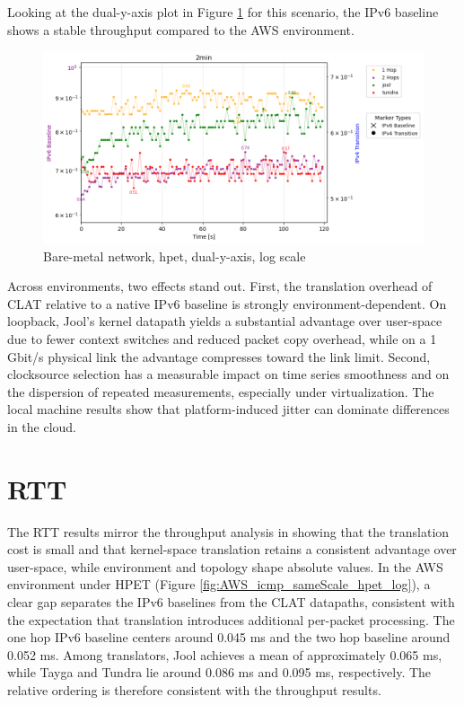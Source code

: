 Looking at the dual-y-axis plot in Figure \ref{fig:Double_tcp_dualAxis_hpet_log} for this scenario, the IPv6 baseline shows a stable throughput compared to the AWS environment.
\begin{figure}[H]
    \centering
    \includegraphics[width=1\textwidth]{resources/finalPlots/Jitterplots/LocalDouble_tcp_dualAxis_hpet_2min_log.png}
    \caption{Bare-metal network, hpet, dual-y-axis, log scale}
    \label{fig:Double_tcp_dualAxis_hpet_log}
\end{figure}

Across environments, two effects stand out. First, the translation overhead of CLAT relative to a native IPv6 baseline is strongly environment-dependent. On loopback, Jool’s kernel datapath yields a substantial advantage over user-space due to fewer context switches and reduced packet copy overhead, while on a 1 Gbit/s physical link the advantage compresses toward the link limit. Second, clocksource selection has a measurable impact on time series smoothness and on the dispersion of repeated measurements, especially under virtualization. The local machine results show that platform-induced jitter can dominate differences in the cloud.

\section{RTT}
The RTT results mirror the throughput analysis in showing that the translation cost is small and that kernel-space translation retains a consistent advantage over user-space, while environment and topology shape absolute values. In the AWS environment under HPET (Figure \ref{fig:AWS_icmp_sameScale_hpet_log}), a clear gap separates the IPv6 baselines from the CLAT datapaths, consistent with the expectation that translation introduces additional per-packet processing. The one hop IPv6 baseline centers around 0.045 ms and the two hop baseline around 0.052 ms. Among translators, Jool achieves a mean of approximately 0.065 ms, while Tayga and Tundra lie around 0.086 ms and 0.095 ms, respectively. The relative ordering is therefore consistent with the throughput results.



